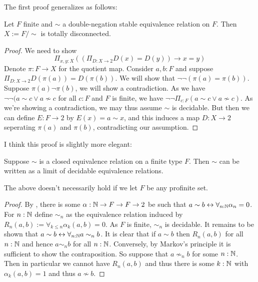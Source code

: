 The first proof generalizes as follows:
\begin{lemma}
  Let $F$ finite and $\sim $ a double-negation stable equivalence relation on $F$. 
  Then $X:=F/\sim$ is totally disconnected. 
\end{lemma}
\begin{proof}
  We need to show 
  $$
  \Pi_{x,y:X} ((\Pi_{D:X\to 2} D(x) = D(y)) \to x = y)
  $$
  Denote $\pi: F\to X$ for the quotient map. Consider $a,b:F$ and suppose $\Pi_{D:X\to 2} D(\pi(a)) = D(\pi (b))$. We will show that $\neg \neg (\pi(a) = \pi(b))$. 
  Suppose $\pi(a)\neg \pi(b)$, we will show a contradiction. As we have $\neg \neg (a \sim c \vee a\nsim c$ for all $c:F$ and $F$ is finite, we have $\neg\neg \Pi_{c:F} (a\sim c \vee a \nsim c)$. As we're showing a contradiction, we may thus assume $\sim$ is decidable. But then we can define $E: F\to 2$ by $E(x)=a \sim x$, and this induces a map $D:X \to 2$ seperating $\pi(a)$ and $\pi(b)$, contradicting our assumption. 
\end{proof}

I think this proof is slightly more elegant:
\begin{lemma}\label{eqRelApproxFin}
  Suppose $\sim$ is a closed equivalence relation on a finite type $F$. Then $\sim$ can be written as a limit of decidable equivalence relations. 
\end{lemma}
\begin{remark}
  The above doesn't necessarily hold if we let $F$ be any profinite set. 
\end{remark}
\begin{proof}
  By \parencite[Thm 3.11.]{synthetic-stone-duality}, there is some $\alpha : \mathbb{N} \to F \to F \to 2$ be such that $a \sim b \leftrightarrow \forall_{n:\mathbb{N}} \alpha_n = 0$. 
  For $n:\mathbb{N}$ define $\sim_n$ as the equivalence relation induced by $R_n(a,b) := \forall_{k\leq n} \alpha_k(a,b) = 0$. As $F$ is finite, $\sim_n$ is decidable. It remains to be shown that $a\sim b \leftrightarrow \forall_{n:\mathbb{N}} a\sim_n b$. It is clear that if $a\sim b$ then $R_n(a,b)$ for all $n:\mathbb{N}$ and hence $a \sim_n b$ for all $n:\mathbb{N}$. 
  Conversely, by Markov's principle it is sufficient to show the contraposition. So suppose that $a \nsim_n b$ for some $n:\mathbb{N}$. Then in particular we cannot have $R_n(a,b)$ and thus there is some $k:\mathbb{N}$ with $\alpha_k(a,b) = 1$ and thus $a\nsim b$. 
\end{proof}

